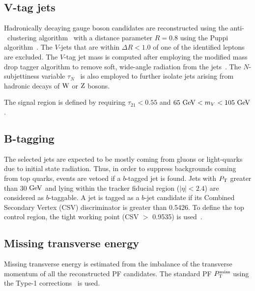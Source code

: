 \subsection{V-tag jets}
Hadronically decaying gauge boson candidates are reconstructed using the anti-\kt~clustering algorithm~\cite{antikt} with a distance parameter $R=0.8$ using the Puppi algorithm~\cite{Bertolini:2014bba}. The $V$-jets that are within $\Delta R < 1.0$ of one of the identified leptons are excluded. The $V$-tag jet mass is computed after employing the modified mass drop tagger algorithm to remove soft, wide-angle radiation from the jets~\cite{Dasgupta:2013ihk,Larkoski:2014wba}. The $N$-subjettiness variable $\tau_N$~\cite{Thaler:2010tr} is also employed to further isolate jets arising from hadronic decays of $\mathrm{W}$ or $\mathrm{Z}$ bosons.   

The signal region is defined by requiring $\tau_{21}<0.55$ and $ 65 ~\mathrm{GeV} < m_{V} < 105 ~\mathrm{GeV}$.

\subsection{B-tagging}

The selected jets are expected to be mostly coming from gluons or light-quarks
due to initial state radiation. Thus, in order to suppress backgrounds coming from top quarks, events are vetoed if a $b$-tagged jet is found.
Jets with $P_\mathrm{T}$ greater than 30 $\mathrm{GeV}$ and lying within the tracker fiducial region ($\left|\eta\right|<2.4$) are considered as $b$-taggable.
A jet is tagged as a $b$-jet candidate if its Combined Secondary Vertex (CSV) discriminator is greater than 0.5426. To define the top control region, the tight working point (CSV $>$ 0.9535) is used~\cite{b-jet_id2013}.


\subsection{Missing transverse energy}
Missing transverse energy is estimated from the imbalance of the transverse momentum of all the reconstructed PF candidates. The standard PF $P_\mathrm{T}^{\mathrm{miss}}$ using the Type-1 corrections~\cite{cms-met-analysis-twiki} is used. 

